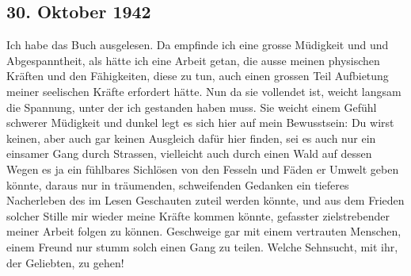 \subsection{30. Oktober 1942}

Ich habe das Buch ausgelesen.
Da empfinde ich eine grosse M\"{u}digkeit und und Abgespanntheit, als h\"{a}tte ich eine Arbeit getan, die ausse meinen physischen Kr\"{a}ften und den F\"{a}higkeiten, diese zu tun, auch einen grossen Teil Aufbietung meiner seelischen Kr\"{a}fte erfordert h\"{a}tte.
Nun da sie vollendet ist, weicht langsam die Spannung, unter der ich gestanden haben muss.
Sie weicht einem Gef\"{u}hl schwerer M\"{u}digkeit und dunkel legt es sich hier auf mein Bewusstsein: Du wirst keinen, aber auch gar keinen Ausgleich daf\"{u}r hier finden, sei es auch nur ein einsamer Gang durch Strassen, vielleicht auch durch einen Wald auf dessen Wegen es ja ein f\"{u}hlbares Sichl\"{o}sen von den Fesseln und F\"{a}den er Umwelt geben k\"{o}nnte, daraus nur in tr\"{a}umenden, schweifenden Gedanken ein tieferes Nacherleben des im Lesen Geschauten zuteil werden k\"{o}nnte, und aus dem Frieden solcher Stille mir wieder meine Kr\"{a}fte kommen k\"{o}nnte, gefasster zielstrebender meiner Arbeit folgen zu k\"{o}nnen.
Geschweige gar mit einem vertrauten Menschen, einem Freund nur stumm solch einen Gang zu teilen.
Welche Sehnsucht, mit ihr, der Geliebten, zu gehen!

\clearpage
